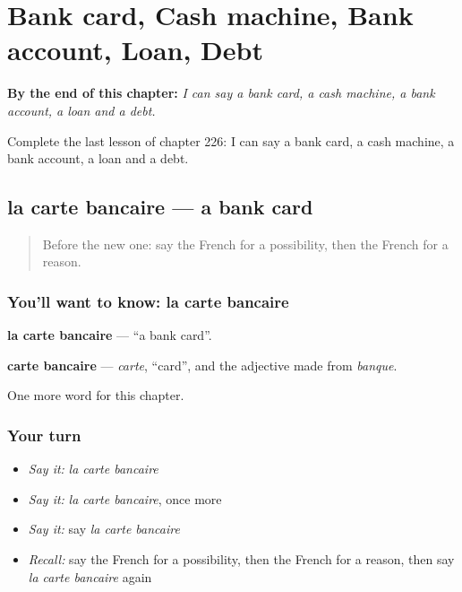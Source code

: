 
\chapter{Bank card, Cash machine, Bank account, Loan, Debt}
\label{ch:fr-bank-card-cash-machine-bank-account-loan-debt}

\begin{chapteropening}
\textbf{By the end of this chapter:} \emph{I can say a bank card, a cash machine, a bank account, a loan and a debt.}

Complete the last lesson of chapter 226: I can say a bank card, a cash machine, a bank account, a loan and a debt.
\end{chapteropening}

\section[la carte bancaire]{la carte bancaire — a bank card}

\label{lesson:FR-C226-carte-bancaire}



\begin{quote}
Before the new one: say the French for a possibility, then the French for a reason.
\end{quote}

\subsection*{You'll want to know: la carte bancaire}
\textbf{la carte bancaire} — \textquotedblleft{}a bank card\textquotedblright{}.

\begin{cousinweb}
\textbf{carte bancaire} — \emph{carte}, \textquotedblleft{}card\textquotedblright{}, and the adjective made from \emph{banque}.
\end{cousinweb}

\begin{grammarlens}[title={What you've built}]
One more word for this chapter.
\end{grammarlens}

\subsection*{Your turn}
\begin{itemize}
\raggedright
  \item \emph{Say it:} \emph{la carte bancaire}
  \item \emph{Say it:} \emph{la carte bancaire}, once more
  \item \emph{Say it:} say \emph{la carte bancaire}
  \item \emph{Recall:} say the French for a possibility, then the French for a reason, then say \emph{la carte bancaire} again
\end{itemize}

